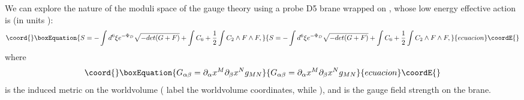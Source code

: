\documentclass[a4paper,12pt]{article}
\begin{document}
We can explore the nature of the moduli space of the gauge theory using
a probe D5 brane wrapped on \coordHE{}, whose low energy effective action is (in units \coordHE{}):
\begin{equation}\coord{}\boxEquation{
S=-\int d^{6}\xi e^{-\Phi_{D}}\sqrt{-det(G+F)} + \int C_{6} +{1\over2} \int C_{2}\wedge F\wedge F ,
\label{azione}
}{
S=-\int d^{6}\xi e^{-\Phi_{D}}\sqrt{-det(G+F)} + \int C_{6} +{1\over2} \int C_{2}\wedge F\wedge F ,
}{ecuacion}\coordE{}\end{equation}
where
\begin{equation}\coord{}\boxEquation{
G_{\alpha\beta}=\partial_{\alpha}x^{M}\partial_{\beta}x^{N}g_{MN}
}{
G_{\alpha\beta}=\partial_{\alpha}x^{M}\partial_{\beta}x^{N}g_{MN}
}{ecuacion}\coordE{}\end{equation}
is the induced metric on the worldvolume (\coordHE{} label the worldvolume coordinates, while \coordHE{}), and \coordHE{} is the gauge field strength on the brane.
\end{document}
